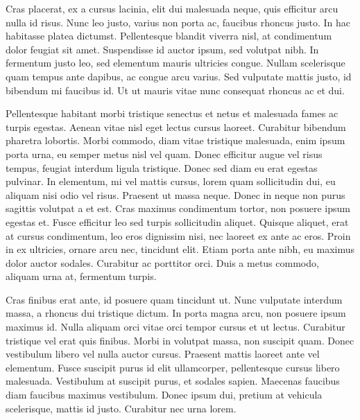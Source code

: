 Cras placerat, ex a cursus lacinia, elit dui malesuada neque, quis efficitur arcu nulla id risus. Nunc leo justo, varius non porta ac, faucibus rhoncus justo. In hac habitasse platea dictumst. Pellentesque blandit viverra nisl, at condimentum dolor feugiat sit amet. \cite{balogh2012prediction,balogh2013codemetropolisBase,balogh2012SSBSE} Suspendisse id auctor ipsum, sed volutpat nibh. In fermentum justo leo, sed elementum mauris ultricies congue. Nullam scelerisque quam tempus ante dapibus, ac congue arcu varius. Sed vulputate mattis justo, id bibendum mi faucibus id. Ut ut mauris vitae nunc consequat rhoncus ac et dui.

Pellentesque habitant morbi tristique senectus et netus et malesuada fames ac turpis egestas. Aenean vitae nisl eget lectus cursus laoreet. Curabitur bibendum pharetra lobortis. Morbi commodo, diam vitae tristique malesuada, enim ipsum porta urna, eu semper metus nisl vel quam. Donec efficitur augue vel risus tempus, feugiat interdum ligula tristique. Donec sed diam eu erat egestas pulvinar. In elementum, mi vel mattis cursus, lorem quam sollicitudin dui, eu aliquam nisi odio vel risus. Praesent ut massa neque. Donec in neque non purus sagittis volutpat a et est. Cras maximus condimentum tortor, non posuere ipsum egestas et. Fusce efficitur leo sed turpis sollicitudin aliquet. \cite{balogh2013codemetropolisBase,balogh2012SSBSE} Quisque aliquet, erat at cursus condimentum, leo eros dignissim nisi, nec laoreet ex ante ac eros. Proin in ex ultricies, ornare arcu nec, tincidunt elit. Etiam porta ante nibh, eu maximus dolor auctor sodales. Curabitur ac porttitor orci. Duis a metus commodo, aliquam urna at, fermentum turpis.

Cras finibus erat ante, id posuere quam tincidunt ut. Nunc vulputate interdum massa, a rhoncus dui tristique dictum. In porta magna arcu, non posuere ipsum maximus id. Nulla aliquam orci vitae orci tempor cursus et ut lectus. Curabitur tristique vel erat quis finibus. \cite{balogh2013codemetropolisBase,} Morbi in volutpat massa, non suscipit quam. Donec vestibulum libero vel nulla auctor cursus. Praesent mattis laoreet ante vel elementum. Fusce suscipit purus id elit ullamcorper, pellentesque cursus libero malesuada. Vestibulum at suscipit purus, et sodales sapien. Maecenas faucibus diam faucibus maximus vestibulum. Donec ipsum dui, pretium at vehicula scelerisque, mattis id justo. Curabitur nec urna lorem.